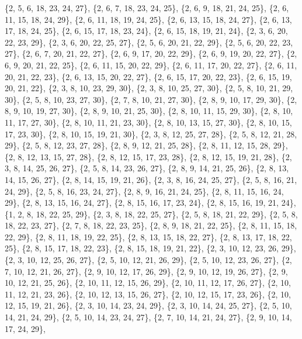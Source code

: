\documentclass[11pt,a4paper]{article}
\begin{document}
{\{2, 5, 6, 18, 23, 24, 27\}, \{2, 6, 7, 18, 23, 24, 25\}, \{2, 6, 9, 18, 21, 24, 25\}, \{2, 6, 11, 15, 18, 24, 29\}, \{2, 6, 11, 18, 19, 24, 25\},
\{2, 6, 13, 15, 18, 24, 27\}, \{2, 6, 13, 17, 18, 24, 25\}, \{2, 6, 15, 17, 18, 23, 24\}, \{2, 6, 15, 18, 19, 21, 24\}, \{2, 3, 6, 20, 22, 23, 29\},
\{2, 3, 6, 20, 22, 25, 27\}, \{2, 5, 6, 20, 21, 22, 29\}, \{2, 5, 6, 20, 22, 23, 27\}, \{2, 6, 7, 20, 21, 22, 27\}, \{2, 6, 9, 17, 20, 22, 29\},
\{2, 6, 9, 19, 20, 22, 27\}, \{2, 6, 9, 20, 21, 22, 25\}, \{2, 6, 11, 15, 20, 22, 29\}, \{2, 6, 11, 17, 20, 22, 27\}, \{2, 6, 11, 20, 21, 22, 23\},
\{2, 6, 13, 15, 20, 22, 27\}, \{2, 6, 15, 17, 20, 22, 23\}, \{2, 6, 15, 19, 20, 21, 22\}, \{2, 3, 8, 10, 23, 29, 30\}, \{2, 3, 8, 10, 25, 27, 30\},
\{2, 5, 8, 10, 21, 29, 30\}, \{2, 5, 8, 10, 23, 27, 30\}, \{2, 7, 8, 10, 21, 27, 30\}, \{2, 8, 9, 10, 17, 29, 30\}, \{2, 8, 9, 10, 19, 27, 30\},
\{2, 8, 9, 10, 21, 25, 30\}, \{2, 8, 10, 11, 15, 29, 30\}, \{2, 8, 10, 11, 17, 27, 30\}, \{2, 8, 10, 11, 21, 23, 30\}, \{2, 8, 10, 13, 15, 27, 30\},
\{2, 8, 10, 15, 17, 23, 30\}, \{2, 8, 10, 15, 19, 21, 30\}, \{2, 3, 8, 12, 25, 27, 28\}, \{2, 5, 8, 12, 21, 28, 29\}, \{2, 5, 8, 12, 23, 27, 28\},
\{2, 8, 9, 12, 21, 25, 28\}, \{2, 8, 11, 12, 15, 28, 29\}, \{2, 8, 12, 13, 15, 27, 28\}, \{2, 8, 12, 15, 17, 23, 28\}, \{2, 8, 12, 15, 19, 21, 28\},
\{2, 3, 8, 14, 25, 26, 27\}, \{2, 5, 8, 14, 23, 26, 27\}, \{2, 8, 9, 14, 21, 25, 26\}, \{2, 8, 13, 14, 15, 26, 27\}, \{2, 8, 14, 15, 19, 21, 26\},
\{2, 3, 8, 16, 24, 25, 27\}, \{2, 5, 8, 16, 21, 24, 29\}, \{2, 5, 8, 16, 23, 24, 27\}, \{2, 8, 9, 16, 21, 24, 25\}, \{2, 8, 11, 15, 16, 24, 29\},
\{2, 8, 13, 15, 16, 24, 27\}, \{2, 8, 15, 16, 17, 23, 24\}, \{2, 8, 15, 16, 19, 21, 24\}, \{1, 2, 8, 18, 22, 25, 29\}, \{2, 3, 8, 18, 22, 25, 27\},
\{2, 5, 8, 18, 21, 22, 29\}, \{2, 5, 8, 18, 22, 23, 27\}, \{2, 7, 8, 18, 22, 23, 25\}, \{2, 8, 9, 18, 21, 22, 25\}, \{2, 8, 11, 15, 18, 22, 29\},
\{2, 8, 11, 18, 19, 22, 25\}, \{2, 8, 13, 15, 18, 22, 27\}, \{2, 8, 13, 17, 18, 22, 25\}, \{2, 8, 15, 17, 18, 22, 23\}, \{2, 8, 15, 18, 19, 21, 22\},
\{2, 3, 10, 12, 23, 26, 29\}, \{2, 3, 10, 12, 25, 26, 27\}, \{2, 5, 10, 12, 21, 26, 29\}, \{2, 5, 10, 12, 23, 26, 27\}, \{2, 7, 10, 12, 21, 26, 27\},
\{2, 9, 10, 12, 17, 26, 29\}, \{2, 9, 10, 12, 19, 26, 27\}, \{2, 9, 10, 12, 21, 25, 26\}, \{2, 10, 11, 12, 15, 26, 29\}, \{2, 10, 11, 12, 17, 26, 27\},
\{2, 10, 11, 12, 21, 23, 26\}, \{2, 10, 12, 13, 15, 26, 27\}, \{2, 10, 12, 15, 17, 23, 26\}, \{2, 10, 12, 15, 19, 21, 26\}, \{2, 3, 10, 14, 23, 24, 29\},
\{2, 3, 10, 14, 24, 25, 27\}, \{2, 5, 10, 14, 21, 24, 29\}, \{2, 5, 10, 14, 23, 24, 27\}, \{2, 7, 10, 14, 21, 24, 27\}, \{2, 9, 10, 14, 17, 24, 29\},
}
\end{document}
